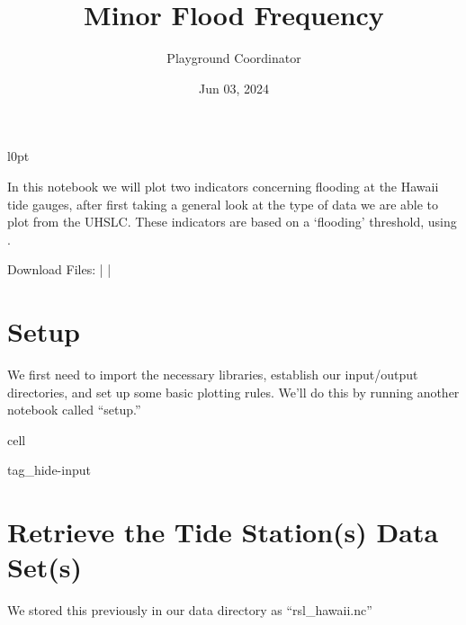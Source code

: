 \documentclass[letterpaper,10pt,english]{jupyterBook}
\title{Minor Flood Frequency}
\date{Jun 03, 2024}
\author{Playground Coordinator}
\begin{document}
\pagestyle{empty}
\sphinxmaketitle
\pagestyle{plain}
\sphinxtableofcontents
\pagestyle{normal}
\label{\detokenize{notebooks/FloodFrequency::doc}}



\begin{wrapfigure}{l}{0pt}
\centering
\noindent{}
\end{wrapfigure}

\sphinxAtStartPar
In this notebook we will plot two indicators concerning flooding at the Hawaii tide gauges, after first taking a general look at the type of data we are able to plot from the UHSLC. These indicators are based on a ‘flooding’ threshold, using .

\sphinxAtStartPar
Download Files:
 |
 |


\part{Setup}
\label{\detokenize{notebooks/FloodFrequency:setup}}
\sphinxAtStartPar
We first need to import the necessary libraries, establish our input/output directories, and set up some basic plotting rules. We’ll do this by running another notebook called “setup.”

\begin{sphinxuseclass}{cell}
\begin{sphinxuseclass}{tag_hide-input}
\end{sphinxuseclass}
\end{sphinxuseclass}

\part{Retrieve the Tide Station(s) Data Set(s)}
\label{\detokenize{notebooks/FloodFrequency:retrieve-the-tide-station-s-data-set-s}}
\sphinxAtStartPar
We stored this previously in our data directory as “rsl\_hawaii.nc”
\end{document}
